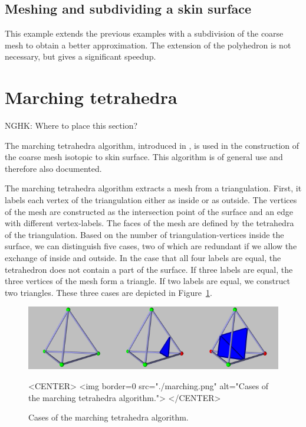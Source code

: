 \subsection{Meshing and subdividing a skin surface}
This example extends the previous examples with a subdivision of the
coarse mesh to obtain a better approximation. The extension of the
polyhedron is not necessary, but gives a significant speedup.



\section{Marching tetrahedra}
NGHK: Where to place this section?

The marching tetrahedra algorithm, introduced in
\cite{cgal:tpg-rmtiise-99}, is used in the construction of the coarse
mesh isotopic to skin surface. This algorithm is of general use and
therefore also documented.

The marching tetrahedra algorithm extracts a mesh from a
triangulation.  First, it labels each vertex of the triangulation
either as inside or as outside. The vertices of the mesh are
constructed as the intersection point of the surface and an edge with
different vertex-labels. The faces of the mesh are defined by the
tetrahedra of the triangulation. Based on the number of
triangulation-vertices inside the surface, we can distinguish five
cases, two of which are redundant if we allow the exchange of inside
and outside. In the case that all four labels are equal, the
tetrahedron does not contain a part of the surface. If three labels
are equal, the three vertices of the mesh form a triangle. If two
labels are equal, we construct two triangles. These three cases are
depicted in Figure~\ref{SkinSurface3-fig-marching}.

\begin{figure}
\begin{ccTexOnly}
\begin{center}
\includegraphics[width=.8\textwidth]{Skin_surface_3/marching}
\end{center}
\end{ccTexOnly}
\begin{ccHtmlOnly}
<CENTER>
<img border=0 src="./marching.png"
alt="Cases of the marching tetrahedra algorithm.">
</CENTER>
\end{ccHtmlOnly}

\caption{\label{SkinSurface3-fig-marching} Cases of the marching
  tetrahedra algorithm.}
\end{figure}

